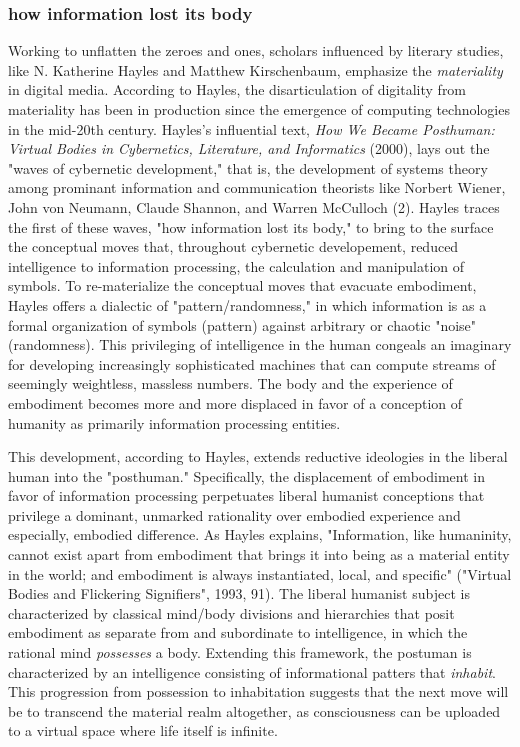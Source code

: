 \documentclass[11pt]{article}
\begin{document}
\subsubsection{how information lost its body}
\label{sec:orgf3e8b94}
Working to unflatten the zeroes and ones, scholars influenced by
literary studies, like N. Katherine Hayles and Matthew Kirschenbaum,
emphasize the \emph{materiality} in digital media. According to Hayles, the
disarticulation of digitality from materiality has been in production
since the emergence of computing technologies in the mid-20th
century. Hayles's influential text, \emph{How We Became Posthuman: Virtual
Bodies in Cybernetics, Literature, and Informatics} (2000), lays out
the "waves of cybernetic development," that is, the development of
systems theory among prominant information and communication theorists
like Norbert Wiener, John von Neumann, Claude Shannon, and Warren
McCulloch (2). Hayles traces the first of these waves, "how
information lost its body," to bring to the surface the conceptual
moves that, throughout cybernetic developement, reduced intelligence
to information processing, the calculation and manipulation of
symbols. To re-materialize the conceptual moves that evacuate
embodiment, Hayles offers a dialectic of "pattern/randomness," in
which information is as a formal organization of symbols (pattern)
against arbitrary or chaotic "noise" (randomness). This privileging of
intelligence in the human congeals an imaginary for developing
increasingly sophisticated machines that can compute streams of
seemingly weightless, massless numbers. The body and the experience of
embodiment becomes more and more displaced in favor of a conception of
humanity as primarily information processing entities.

This development, according to Hayles, extends reductive ideologies in
the liberal human into the "posthuman." Specifically, the displacement
of embodiment in favor of information processing perpetuates liberal
humanist conceptions that privilege a dominant, unmarked rationality
over embodied experience and especially, embodied difference. As
Hayles explains, "Information, like humaninity, cannot exist apart
from embodiment that brings it into being as a material entity in the
world; and embodiment is always instantiated, local, and specific"
("Virtual Bodies and Flickering Signifiers", 1993, 91). The liberal
humanist subject is characterized by classical mind/body divisions and
hierarchies that posit embodiment as separate from and subordinate to
intelligence, in which the rational mind \emph{possesses} a body. Extending
this framework, the postuman is characterized by an intelligence
consisting of informational patters that \emph{inhabit}. This progression
from possession to inhabitation suggests that the next move will be to
transcend the material realm altogether, as consciousness can be
uploaded to a virtual space where life itself is infinite.
\end{document}
